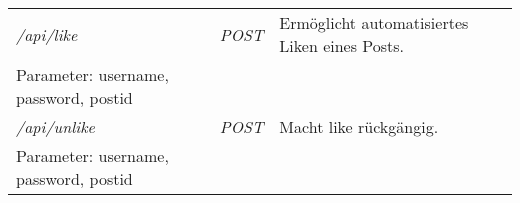 \documentclass[parskip=half*]{scrartcl}
\begin{document}
\begin{table}[ht]
\begin{center}
\begin{tabular}{|L{7cm}|C{1.2cm}|L{7cm}|}
\emph{/api/like} & \emph{POST} & Ermöglicht automatisiertes Liken eines Posts.\\
Parameter: username, password, postid & & \\\hline
\emph{/api/unlike} & \emph{POST} & Macht like rückgängig.\\ 
Parameter: username, password, postid & & \\\hline

\end{tabular}	
\end{center}
\end{table}
\egroup
\end{document}
